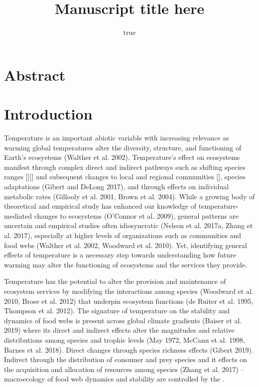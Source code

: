 \documentclass[
]{article}
\title{Manuscript title here}
\author{true}
\date{}
\begin{document}
\maketitle

\newpage

\hypertarget{abstract}{%
\section{Abstract}\label{abstract}}

\newpage

\hypertarget{introduction}{%
\section{Introduction}\label{introduction}}

\setlength\parindent{24pt}

Temperature is an important abiotic variable with increasing relevance
as warming global temperatures alter the diversity, structure, and
functioning of Earth's ecosystems (Walther et al. 2002). Temperature's
effect on ecosystems manifest through complex direct and indirect
pathways such as shifting species ranges {[}{]}{[}{]} and subsequent
changes to local and regional communities {[}{]}, species adaptations
(Gibert and DeLong 2017), and through effects on individual metabolic
rates (Gillooly et al. 2001, Brown et al. 2004). While a growing body of
theoretical and empirical study has enhanced our knowledge of
temperature-mediated changes to ecosystems (O'Connor et al. 2009),
general patterns are uncertain and empirical studies often idiosyncratic
(Nelson et al. 2017a, Zhang et al. 2017), especially at higher levels of
organizations such as communities and food webs (Walther et al. 2002,
Woodward et al. 2010). Yet, identifying general effects of temperature
is a necessary step towards understanding how future warming may alter
the functioning of ecosystems and the services they provide.

\par

\setlength\parindent{24pt}

Temperature has the potential to alter the provision and maintenance of
ecosystem services by modifying the interactions among species (Woodward
et al. 2010, Brose et al. 2012) that underpin ecosystem functions (de
Ruiter et al. 1995, Thompson et al. 2012). The signature of temperature
on the stability and dynamics of food webs is present across global
climate gradients (Baiser et al. 2019) where its direct and indirect
effects alter the magnitudes and relative distributions among species
and trophic levels (May 1972, McCann et al. 1998, Barnes et al. 2018).
Direct changes through species richness effects (Gibert 2019). Indirect
through the distribution of consumer and prey species and it effects on
the acquisition and allocation of resources among species (Zhang et al.
2017) --macroecology of food web dynamics and stability are controlled
by the .
\end{document}
